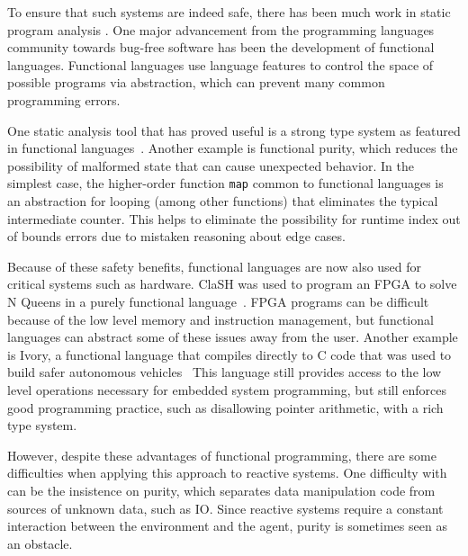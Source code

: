 To ensure that such systems are indeed safe, there has been much work in static program analysis .
One major advancement from the programming languages community towards bug-free software has been the development of functional languages.
Functional languages use language features to control the space of possible programs via abstraction, which can prevent many common programming errors.

One static analysis tool that has proved useful is a strong type system as featured in functional languages~\cite{cardelli1996type}.
Another example is functional purity, which reduces the possibility of malformed state that can cause unexpected behavior.
In the simplest case, the higher-order function \texttt{map} common to functional languages is an abstraction for looping (among other functions) that eliminates the typical intermediate counter.
This helps to eliminate the possibility for runtime index out of bounds errors due to mistaken reasoning about edge cases.

Because of these safety benefits, functional languages are now also used for critical systems such as hardware.
ClaSH was used to program an FPGA to solve N Queens in a purely functional language~\cite{clash2014}.
FPGA programs can be difficult because of the low level memory and instruction management, but functional languages can abstract some of these issues away from the user.
Another example is Ivory, a functional language that compiles directly to C code that was used to build safer autonomous vehicles~\cite{pike2014}
This language still provides access to the low level operations necessary for embedded system programming, but still enforces good programming practice, such as disallowing pointer arithmetic, with a rich type system.

However, despite these advantages of functional programming, there are some difficulties when applying this approach to reactive systems.
One difficulty with can be the insistence on purity, which separates data manipulation code from sources of unknown data, such as IO.
Since reactive systems require a constant interaction between the environment and the agent, purity is sometimes seen as an obstacle.

